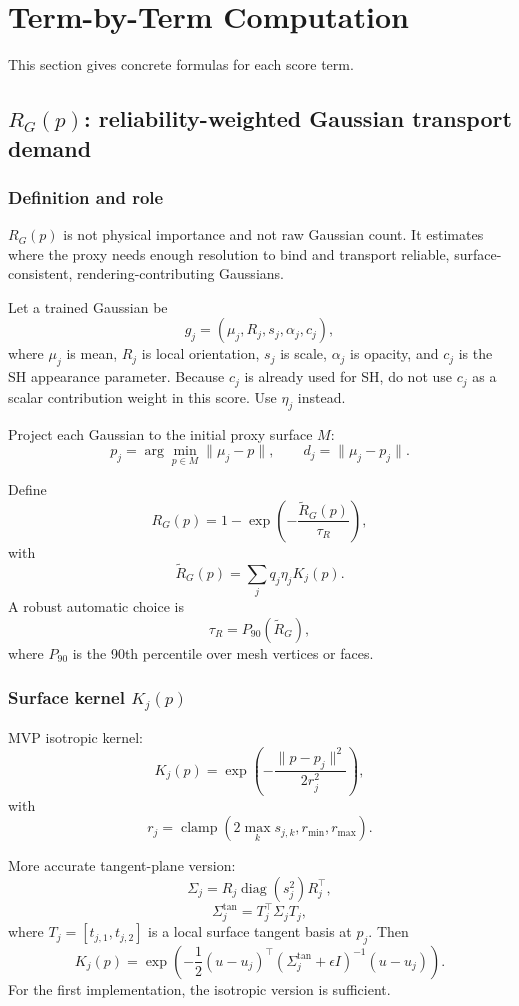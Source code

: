 \documentclass[11pt,a4paper]{article}
\newcommand{\Rraw}{\widetilde{R}_G}
\newcommand{\clamp}{\operatorname{clamp}}
\begin{document}
\section{Term-by-Term Computation}

This section gives concrete formulas for each score term.

\subsection{$R_G(p)$: reliability-weighted Gaussian transport demand}

\subsubsection{Definition and role}

$R_G(p)$ is not physical importance and not raw Gaussian count. It estimates where the proxy needs enough resolution to bind and transport reliable, surface-consistent, rendering-contributing Gaussians.

Let a trained Gaussian be
\[
g_j=(\mu_j,R_j,s_j,\alpha_j,c_j),
\]
where $\mu_j$ is mean, $R_j$ is local orientation, $s_j$ is scale, $\alpha_j$ is opacity, and $c_j$ is the SH appearance parameter. Because $c_j$ is already used for SH, do not use $c_j$ as a scalar contribution weight in this score. Use $\eta_j$ instead.

Project each Gaussian to the initial proxy surface $M$:
\[
p_j=\arg\min_{p\in M}\|\mu_j-p\|,
\qquad
 d_j=\|\mu_j-p_j\|.
\]

Define
\[
R_G(p)=1-\exp\left(-\frac{\Rraw(p)}{\tau_R}\right),
\]
with
\[
\Rraw(p)=\sum_j q_j\eta_j K_j(p).
\]
A robust automatic choice is
\[
\tau_R=P_{90}(\Rraw),
\]
where $P_{90}$ is the 90th percentile over mesh vertices or faces.

\subsubsection{Surface kernel $K_j(p)$}

MVP isotropic kernel:
\[
K_j(p)=\exp\left(-\frac{\|p-p_j\|^2}{2r_j^2}\right),
\]
with
\[
r_j=\clamp\left(2\max_k s_{j,k},r_{\min},r_{\max}\right).
\]

More accurate tangent-plane version:
\[
\Sigma_j=R_j\operatorname{diag}(s_j^2)R_j^\top,
\]
\[
\Sigma_j^{\mathrm{tan}}=T_j^\top \Sigma_j T_j,
\]
where $T_j=[t_{j,1},t_{j,2}]$ is a local surface tangent basis at $p_j$. Then
\[
K_j(p)=\exp\left(-\frac{1}{2}(u-u_j)^\top(\Sigma_j^{\mathrm{tan}}+\epsilon I)^{-1}(u-u_j)\right).
\]
For the first implementation, the isotropic version is sufficient.
\end{document}
